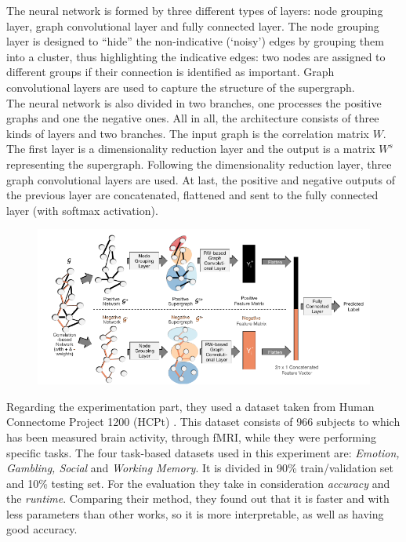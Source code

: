 The neural network is formed by three different types of layers: node grouping layer, graph convolutional layer and fully connected layer. The node grouping layer is designed to “hide” the non-indicative (‘noisy’) edges by grouping them into a cluster, thus highlighting the indicative edges: two nodes are assigned to different groups if their connection is identified as important.
Graph convolutional layers are used to capture the structure of the supergraph.
\\

The neural network is also divided in two branches, one processes the positive graphs and one the negative ones. 
All in all, the architecture consists of three kinds of layers and two branches. 
The input graph is the correlation matrix $W$. The first layer is a dimensionality reduction layer and the output is a matrix $W^{s}$ representing the supergraph. Following the dimensionality reduction layer, three graph convolutional layers are used. At last, the positive and negative outputs of the previous layer are concatenated, flattened and sent to the fully connected layer (with softmax activation).

\begin{figure}[htbp]
	\centering
	\includegraphics[scale=0.65]{Immagini/Groupinn1.PNG}
	\caption{\label{fig:diagram5}}
\end{figure}

Regarding the experimentation part, they used a dataset taken from Human Connectome Project 1200 (HCPt) \cite{hcp}. 
This dataset consists of 966 subjects to which has been measured brain activity, through fMRI, while they were performing specific tasks. The four task-based datasets used in this experiment are: \textit{Emotion, Gambling, Social} and \textit{Working Memory}. It is divided in 90\% train/validation set and 10\% testing set. For the evaluation they take in consideration \textit{accuracy} and the \textit{runtime}. Comparing their method, they found out that it is faster and with less parameters than other works, so it is more interpretable, as well as having good accuracy.
\\

